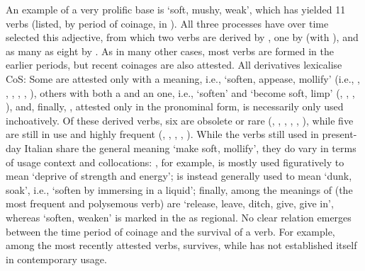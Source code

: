 \documentclass[output=paper,colorlinks,citecolor=brown]{langscibook}
\begin{document}
An example of a very prolific base is  ‘soft, mushy, weak’, which has yielded 11 verbs (listed, by period of coinage, in ). All three processes have over time selected this adjective, from which two verbs are derived by , one by  (with ), and as many as eight by . As in many other cases, most verbs are formed in the earlier periods, but recent coinages are also attested. All derivatives lexicalise CoS: Some are attested only with a  meaning, i.e., ‘soften, appease, mollify’ (i.e., \mbox{,} \mbox{,} , , , ), others with both a  and an  one, i.e., ‘soften’ and ‘become soft, limp’ (, , , ), and, finally, , attested only in the pronominal form, is necessarily only used inchoatively. Of these derived verbs, six are obsolete or rare (, , , , , ), while five are still in use and highly frequent (, , , , ). While the verbs still used in present-day Italian share the general meaning ‘make soft, mollify’, they do vary in terms of usage context and collocations: , for example, is mostly used figuratively to mean ‘deprive of strength and energy’;  is instead generally used to mean ‘dunk, soak’, i.e., ‘soften by immersing in a liquid’; finally, among the meanings of  (the most frequent and polysemous verb) are ‘release, leave, ditch, give, give in’, whereas ‘soften, weaken’ is marked in the  as regional. No clear relation emerges between the time period of coinage and the survival of a verb. For example, among the most recently attested verbs,  survives, while  has not established itself in contemporary usage.
\end{document}
